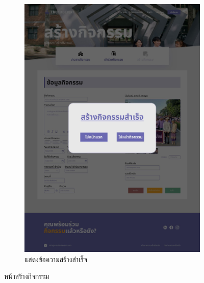 \begin{figure}[h]
\begin{subfigure}[b]{0.3\linewidth}
    \includegraphics[width=\linewidth]{image/Figma-design/Create-event-info-1.jpg}
    \caption{แสดงข้อความสร้างสำเร็จ}
  \end{subfigure}
  \caption{หน้าสร้างกิจกรรม}
  \label{fig:event-create}
\end{figure}

